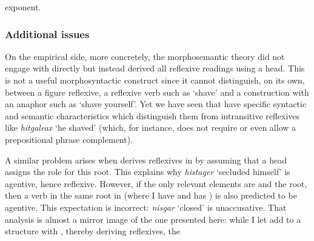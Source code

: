 \begin{exe}
\begin{xlist}
\begin{xlist}
\begin{exe}
\begin{xlist}
\begin{xlist}
\begin{exe}
\begin{xlist}
\begin{xlist}
\begin{exe}
\begin{exe}
\begin{xlist}
\begin{exe}
\begin{exe}
\begin{xlist}
\begin{exe}
\begin{exe}
\begin{exe}
\begin{exe}
\begin{exe}
\begin{xlist}
\begin{exe}
\begin{xlist}
\begin{exe}
\begin{exe}
\begin{xlist}
\begin{exe}
\begin{xlist}
\begin{exe}
\begin{xlist}
\begin{exe}
\begin{exe}
\begin{exe}
\begin{xlist}
\begin{exe}
\begin{exe}
\begin{exe}
\begin{xlist}
\begin{exe}
\begin{xlist}
\begin{exe}
\begin{xlist}
\begin{exe}
\begin{xlist}
\begin{exe}
\begin{exe}
\begin{exe}
\begin{exe}
\begin{xlist}
\begin{exe}
\begin{xlist}
\begin{exe}
\begin{xlist}
\begin{exe}
\begin{xlist}
\begin{exe}
\begin{xlist}
\begin{exe}
\begin{xlist}
\begin{exe}
\begin{exe}
\begin{exe}
\begin{exe}
\begin{xlist}
\begin{exe}
\begin{xlist}
\begin{exe}
\begin{xlist}
\begin{exe}
\begin{exe}
\begin{xlist}
\begin{exe}
\begin{xlist}
\begin{exe}
\begin{exe}
\begin{exe}
\begin{exe}
\begin{xlist}
\begin{xlist}
\begin{exe}
\begin{xlist}
\begin{exe}
\begin{exe}
\begin{exe}
\begin{xlist}
\begin{exe}
\begin{exe}
\begin{xlist}
\begin{exe}
\begin{exe}
\begin{exe}
\begin{xlist}
\begin{xlist}
\begin{exe}
\begin{xlist}
\begin{exe}
\begin{exe}
\begin{exe}
\begin{exe}
\begin{xlist}
\begin{exe}
\begin{xlist}
\begin{exe}
\begin{xlist}
\begin{exe}
\begin{xlist}
\begin{exe}
\begin{exe}
\begin{exe}
\begin{exe}
\begin{exe}
\begin{exe}
\begin{xlist}
\begin{exe}
\begin{xlist}
\begin{exe}
\begin{xlist}
\begin{exe}
\begin{xlist}
\begin{exe}
\begin{xlist}
\begin{exe}
\begin{xlist}
\begin{exe}
\begin{xlist}
\begin{exe}
\begin{xlist}
exponent.

		\subsubsection{Additional issues}
On the empirical side, more concretely, the morphosemantic theory did not engage with  directly but instead derived all reflexive readings using a  head. This is not a useful morphosyntactic construct since it cannot distinguish, on its own, between a figure reflexive, a reflexive verb such as `shave’ and a construction with an anaphor such as `shave yourself’. Yet we have seen that  have specific syntactic and semantic characteristics which distinguish them from intransitive reflexives like \emph{hitgaleax} `he shaved’ (which, for instance, does not require or even allow a prepositional phrase complement).

A similar problem arises when \citet[60]{doron03} derives reflexives in {\thit} by assuming that a head  assigns the  role for this root. This explains why \emph{histager} `secluded himself' is agentive, hence reflexive. However, if the only relevant elements are {\vz} and the root, then a verb in the same root in {\tnif} (where I have {\vz} and \citealt{doron03} has ) is also predicted to be agentive. This expectation is incorrect: \emph{nisgar} `closed' is unaccusative. That analysis is almost a mirror image of the one presented here: while I let {\va} add  to a structure with \vz, thereby deriving reflexives, the 
\end{xlist}
\end{exe}
\end{xlist}
\end{exe}
\end{xlist}
\end{exe}
\end{xlist}
\end{exe}
\end{xlist}
\end{exe}
\end{xlist}
\end{exe}
\end{xlist}
\end{exe}
\end{xlist}
\end{exe}
\end{exe}
\end{exe}
\end{exe}
\end{exe}
\end{exe}
\end{xlist}
\end{exe}
\end{xlist}
\end{exe}
\end{xlist}
\end{exe}
\end{xlist}
\end{exe}
\end{exe}
\end{exe}
\end{exe}
\end{xlist}
\end{exe}
\end{xlist}
\end{xlist}
\end{exe}
\end{exe}
\end{exe}
\end{xlist}
\end{exe}
\end{exe}
\end{xlist}
\end{exe}
\end{exe}
\end{exe}
\end{xlist}
\end{exe}
\end{xlist}
\end{xlist}
\end{exe}
\end{exe}
\end{exe}
\end{exe}
\end{xlist}
\end{exe}
\end{xlist}
\end{exe}
\end{exe}
\end{xlist}
\end{exe}
\end{xlist}
\end{exe}
\end{xlist}
\end{exe}
\end{exe}
\end{exe}
\end{exe}
\end{xlist}
\end{exe}
\end{xlist}
\end{exe}
\end{xlist}
\end{exe}
\end{xlist}
\end{exe}
\end{xlist}
\end{exe}
\end{xlist}
\end{exe}
\end{exe}
\end{exe}
\end{exe}
\end{xlist}
\end{exe}
\end{xlist}
\end{exe}
\end{xlist}
\end{exe}
\end{xlist}
\end{exe}
\end{exe}
\end{exe}
\end{xlist}
\end{exe}
\end{exe}
\end{exe}
\end{xlist}
\end{exe}
\end{xlist}
\end{exe}
\end{xlist}
\end{exe}
\end{exe}
\end{xlist}
\end{exe}
\end{xlist}
\end{exe}
\end{exe}
\end{exe}
\end{exe}
\end{exe}
\end{xlist}
\end{exe}
\end{exe}
\end{xlist}
\end{exe}
\end{exe}
\end{xlist}
\end{xlist}
\end{exe}
\end{xlist}
\end{xlist}
\end{exe}
\end{xlist}
\end{xlist}
\end{exe}
